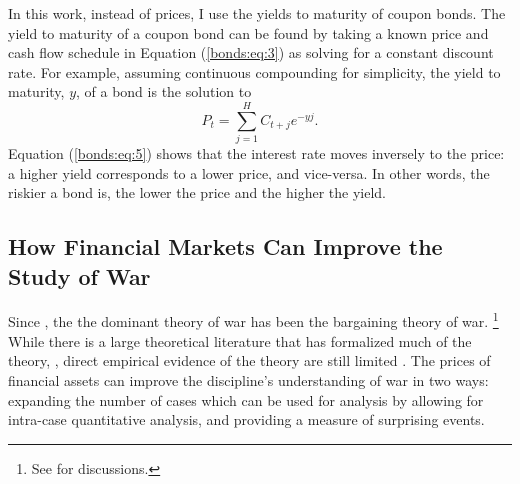 In this work, instead of prices, I use the yields to maturity of coupon bonds.
The yield to maturity of a coupon bond can be found by taking a known price and cash flow schedule in Equation (\ref{bonds:eq:3}) as solving for a constant discount rate.
For example, assuming continuous compounding for simplicity, the yield to maturity, $y$, of a bond is the solution to
\begin{equation}
  \label{bonds:eq:5}
  P_{t} = \sum_{j = 1}^{H} C_{t + j} e^{-y j} \text{.}
\end{equation}
Equation (\ref{bonds:eq:5}) shows that the interest rate moves inversely to the price: a higher yield corresponds to a lower price, and vice-versa.
In other words, the riskier a bond is, the lower the price and the higher the yield.




\subsection{How Financial Markets Can Improve the Study of War}
\label{sec:how-prices-financial-1}

Since \textcite{Fearon1995}, the the dominant theory of war has been the bargaining theory of war.%
\footnote{See \textcites{Reiter2003}{Powell2006}{Reiter2009} for discussions.}
While there is a large theoretical literature that has formalized much of the theory, \parencites{FilsonWerner2002}{Slantchev2003}{SmithStam2004}{Powell2004}{LeventogluSlantchev2007}{LangloisLanglois2009}{WolfordReiterCarrubba2011}, direct empirical evidence of the theory are still limited \parencite{Reiter2009}.
The prices of financial assets can improve the discipline's understanding of war in two ways: expanding the number of cases which can be used for analysis by allowing for intra-case quantitative analysis, and providing a measure of surprising events.

